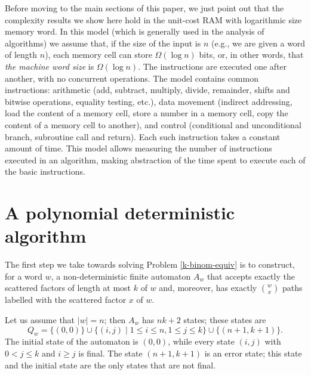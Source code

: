 \documentclass[runningheads]{llncs}
\begin{document}
Before moving to the main sections of this paper, we just point out that the complexity results we show here hold in the unit-cost RAM with logarithmic size memory word. In this model (which is generally used in the analysis of algorithms) we assume that, if the size of the input is $n$ (e.g., we are given a word of length $n$), each memory cell can store $\Omega(\log n)$ bits, or, in other words, that {\em the machine word size} is $\Omega(\log n)$. The instructions are executed one after another, with no concurrent operations. The model contains common instructions: arithmetic (add, subtract, multiply, divide, remainder, shifts and bitwise operations, equality testing, etc.), data movement (indirect addressing, load the content of a memory cell, store a number in a memory cell, copy the content of a memory cell to another), and control (conditional and unconditional branch, subroutine call and return). Each such instruction takes a constant amount of time.  This model allows measuring the number of instructions executed in an algorithm, making abstraction of the time spent to execute each of the basic instructions.

\section{A polynomial deterministic algorithm}

The first step we take towards solving Problem \ref{k-binom-equiv} is to construct, for a word $w$, a non-deterministic finite automaton $A_w$ that accepts exactly the scattered factors of length at most $k$ of $w$ and, moreover, has exactly $w\choose x$ paths labelled with the scattered factor $x$ of $w$. 

Let us assume that $|w|=n$; then $A_w$ has $nk+2$ states; these states are 
$$Q_w= \{(0,0)\}\cup \{(i,j)\mid 1\leq i \leq n, 1\leq j\leq k\}\cup\{(n+1,k+1)\}.$$ 
The initial state of the automaton is $(0,0)$, while every state $(i,j)$ with $0<j\leq k$ and $i\geq j$ is final. The state $(n+1,k+1)$ is an error state; this state and the initial state are the only states that are not final.
\end{document}
